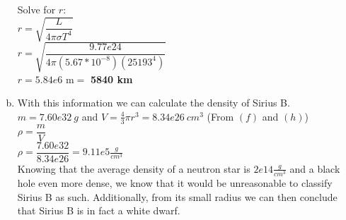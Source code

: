 \documentclass{article}
\begin{document}
\begin{adjustwidth}{.6cm}{}
\begin{enumerate}[a)]
            Solve for $r$:\\

            $r = \sqrt{\dfrac{L}{4{\pi}{\sigma}T^4}}$\\

            $r = \sqrt{\dfrac{9.77e24}{4{\pi}{(5.67*10^{-8})({25193}^4)}}}$\\

            $r = 5.84e6$ m$ = $ \textbf{5840 km}\\
            \item
            With this information we can calculate the density of Sirius B.\\

            $m = 7.60e32\:g$ and $V = \frac{4}{3}\pi r^3 = 8.34e26\:{cm}^3$ (From $(f)$ and $(h)$)\\

            $\rho = \dfrac{m}{V}$\\

            $\rho = \dfrac{7.60e32}{8.34e26} = 9.11e5\frac{g}{cm^3}$\\

            Knowing that the average density of a neutron star is $2e14\frac{g}{cm^3}$ and a black hole even more dense, we know that it would be unreasonable to classify Sirius B as such. Additionally, from its small radius we can then conclude that Sirius B is in fact a white dwarf.
        \end{enumerate}
    \end{adjustwidth}
\end{document}
